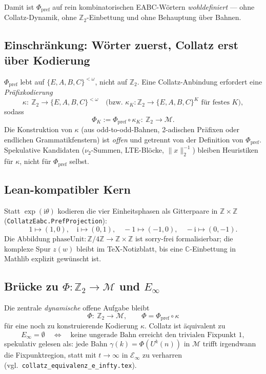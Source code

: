 \documentclass[11pt,a4paper]{article}
\theoremstyle{definition}
\theoremstyle{remark}
\newcommand{\Z}{\mathbb{Z}}
\newcommand{\C}{\mathbb{C}}
\newcommand{\Ztwo}{\mathbb{Z}_2}
\newcommand{\Einf}{E_{\infty}}
\newcommand{\vii}{\nu_2}
\newcommand{\SigmaEABC}{\{E,A,B,C\}}
\newcommand{\Phpref}{\Phi_{\mathrm{pref}}}
\begin{document}
\noindent
Damit ist $\Phpref$ auf rein kombinatorischen EABC-Wörtern
\emph{wohldefiniert} --- ohne Collatz-Dynamik, ohne $\Ztwo$-Einbettung
und ohne Behauptung über Bahnen.

\subsection{Einschränkung: Wörter zuerst, Collatz erst über Kodierung}

$\Phpref$ lebt auf $\SigmaEABC^{<\omega}$, nicht auf $\Ztwo$.
Eine Collatz-Anbindung erfordert eine \emph{Präfixkodierung}
\[
\kappa:\ \Ztwo\longrightarrow \SigmaEABC^{<\omega}
\quad\text{(bzw.\ }\kappa_K:\Ztwo\to\SigmaEABC^K\text{ für festes }K\text{)},
\]
sodass
\[
\Phi_K:=\Phpref\circ\kappa_K:\ \Ztwo\longrightarrow \mathcal{M}.
\]
Die Konstruktion von $\kappa$ (aus odd-to-odd-Bahnen, 2-adischen
Präfixen oder endlichen Grammatikfenstern) ist \emph{offen} und
getrennt von der Definition von $\Phpref$.
Spekulative Kandidaten ($\vii$-Summen, LTE-Blöcke,
$\|x\|_2^{-1}$) bleiben Heuristiken für $\kappa$, nicht für
$\Phpref$ selbst.

\subsection{Lean-kompatibler Kern}

Statt $\exp(\mathrm{i}\theta)$ kodieren die vier Einheitsphasen
als Gitterpaare in $\Z\times\Z$ (\texttt{CollatzEabc.PrefProjection}):
\[
1\mapsto(1,0),\quad
\mathrm{i}\mapsto(0,1),\quad
-1\mapsto(-1,0),\quad
-\mathrm{i}\mapsto(0,-1).
\]
Die Abbildung $\mathrm{phaseUnit}:\Z/4\Z\to\Z\times\Z$ ist
sorry-frei formalisierbar; die komplexe Spur $z(w)$ bleibt
im TeX-Notizblatt, bis eine $\C$-Einbettung in Mathlib
explizit gewünscht ist.

\subsection{Brücke zu \texorpdfstring{$\Phi:\Ztwo\to\mathcal{M}$}{Phi: Z2→M} und \texorpdfstring{$\Einf$}{E\_infty}}

Die zentrale \emph{dynamische} offene Aufgabe bleibt
\[
\Phi:\ \Ztwo\longrightarrow \mathcal{M},
\qquad
\Phi=\Phpref\circ\kappa
\]
für eine noch zu konstruierende Kodierung $\kappa$.
Collatz ist äquivalent zu
\[
\Einf=\emptyset
\quad\Longleftrightarrow\quad
\text{keine ungerade Bahn erreicht den trivialen Fixpunkt }1,
\]
spekulativ gelesen als: jede Bahn $\gamma(k)=\Phi(U^k(n))$ in
$\mathcal{M}$ trifft irgendwann die Fixpunktregion, statt mit
$t\to\infty$ in $\mathcal{E}_\infty$ zu verharren
(vgl.\ \texttt{collatz\_equivalenz\_e\_infty.tex}).
\end{document}
